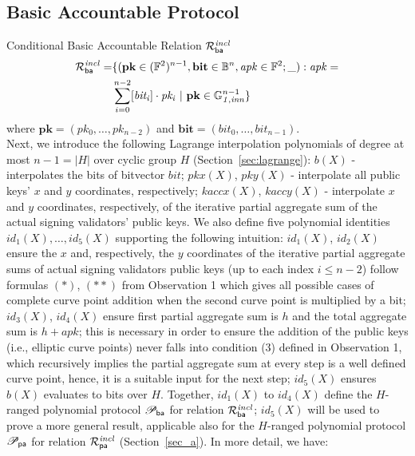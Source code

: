 \subsection{Basic Accountable Protocol}
\label{sec_la}
\noindent \textsf{Conditional Basic Accountable Relation $\mathcal{R}^{\mathit{incl}}_{\mathsf{ba}}$}  
\vspace{-0.055in}
\begin{equation*}
\begin{split}
\Rla = & \{(\mathbf{pk} \in ({\mathbb{F}^2})^{n-1}, \mathbf{bit} \in \mathbb{B}^n,
\mathit{apk} \in \mathbb{F}^2; \_) : \mathit{apk} = \\ &\sum_{i=0}^{n-2} [\mathit{bit_i}] \cdot \mathit{pk_i} \ | \ \mathbf{pk} \in \ginn{1}^{n-1} \} 
\end{split}
\end{equation*}
\vspace{-0.008in}
\noindent where $\mathbf{pk} = (\mathit{pk_0}, \ldots, \mathit{pk_{n-2}})$ and $\mathbf{bit} = (\mathit{bit_0}, \ldots, \mathit{bit_{n-1}})$.\\ 

\noindent Next, we introduce the following Lagrange interpolation polynomials of degree at most $n-1 = |H|$ over cyclic group $H$ (Section~\ref{sec:lagrange}): 
$b(X)$ - interpolates the bits of bitvector $\mathit{bit}$; $pkx(X)$, $pky(X)$ - interpolate all public keys' 
$x$ and $y$ coordinates, respectively; $kaccx(X)$, $kaccy(X)$ - interpolate $x$ and $y$ coordinates, respectively, 
of the iterative partial aggregate sum of the actual signing validators' public keys. We also define five polynomial identities $id_1(X), \ldots, id_5(X)$ supporting the following intuition: $id_1(X)$, $id_2(X)$ 
ensure the $x$ and, respectively, the $y$ coordinates of the iterative partial aggregate sums of actual signing validators public keys (up to each index $i \leq n-2$) 
follow formulas $(\ast)$, $(\ast\ast)$ from Observation 1 which gives all possible cases of 
complete curve point addition when the second curve point is multiplied by a bit; $id_3(X)$, $id_4(X)$ 
ensure first partial aggregate sum is $h$ and the total aggregate sum is $h + \mathit{apk}$; this is necessary in order to ensure the addition of the public keys (i.e., elliptic curve points) 
never falls into condition (3) defined in Observation 1, which recursively implies the partial aggregate sum at every step is a well defined curve point, hence, it is a suitable input for the next step; 
$id_5(X)$ ensures $b(X)$ evaluates to bits over $H$. Together, $id_1(X)$ to $id_4(X)$ define 
the $H$-ranged polynomial protocol $\mathscr{P}_{\mathsf{ba}}$ for relation $\mathcal{R}^{\mathit{incl}}_{\mathsf{ba}}$; $id_5(X)$ will be used to prove a more general result, applicable also for the 
$H$-ranged polynomial protocol $\mathscr{P}_{\mathsf{pa}}$ for relation $\mathcal{R}^{\mathit{incl}}_{\mathsf{pa}}$ (Section~\ref{sec_a}). In more detail, we have:  \\


